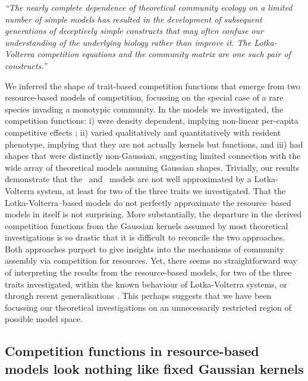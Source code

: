 \documentclass[a4paper,11pt]{article}
\begin{document}
\emph{``The nearly complete dependence of theoretical community ecology on a
limited number of simple models has resulted in the development of subsequent
generations of deceptively simple constructs that may often confuse our
understanding of the underlying biology rather than improve it. The
Lotka-Volterra competition equations and the community matrix are one such
pair of constructs.''} \citep{Neill-1974}

We inferred the shape of trait-based competition functions that emerge
from two resource-based models of competition, focussing on the
special case of a rare species invading a monotypic community.
%
In the models we investigated, the competition functions: i) were
density dependent, implying non-linear per-capita competitive effects
\citep{Abrams-1980}; ii) varied qualitatively and quantitatively with
resident phenotype,
implying that they are not actually kernels but functions,
%
and iii) had shapes that were distinctly non-Gaussian, suggesting
limited connection with the wide array of theoretical models assuming
Gaussian shapes.
%
Trivially, our results demonstrate that the \Rstar\ and \plant\ models
are not well approximated by a Lotka-Volterra system, at least for two
of the three traits we investigated. That the Lotka-Volterra--based
models do not perfectly approximate the resource--based models in
itself is not surprising.
%
More substantially, the departure in the derived competition functions
from the Gaussian kernels assumed by most theoretical investigations
is so drastic that it is difficult to reconcile the two approaches.
Both approaches purport to give insights into the mechanisms of
community assembly via competition for resources.  Yet, there seems no
straightforward way of interpreting the results from the
resource-based models, for two of the three traits investigated,
within the known behaviour of Lotka-Volterra systems, or through
recent generalisations \citep{Leimar-2013}. This perhaps suggests that
we have been focussing our theoretical investigations on an
unnecessarily restricted region of possible model space.

\subsection{Competition functions in resource-based models look nothing like
fixed Gaussian kernels}
\end{document}
